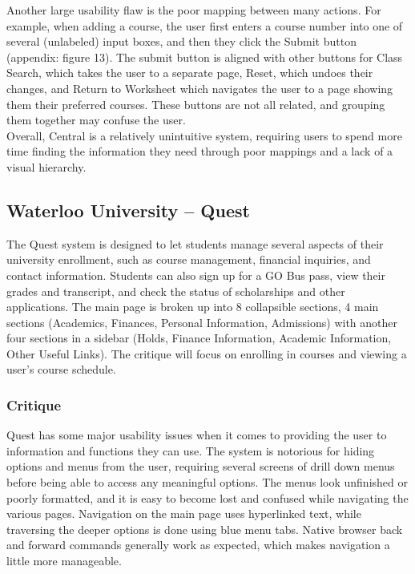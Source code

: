 \documentclass[10pt]{article}
\begin{document}
\begin{multicols}{2}
Another large usability flaw is the poor mapping between many actions. For 
example, when adding a course, the user first enters a course number into one of 
several (unlabeled) input boxes, and then they click the Submit button (appendix: 
figure 13). The submit button is aligned with other buttons for Class Search, 
which takes the user to a separate page, Reset, which undoes their changes, and 
Return to Worksheet which navigates the user to a page showing them their 
preferred courses. These buttons are not all related, and grouping them together 
may confuse the user.\\

Overall, Central is a relatively unintuitive system, requiring users to spend 
more time finding the information they need through poor mappings and a lack of 
a visual hierarchy.

\subsection*{Waterloo University -- Quest}
The Quest system is designed to let students manage several aspects 
of their university enrollment, such as course management, financial inquiries, 
and contact information. Students can also sign up for a GO Bus pass, view their 
grades and transcript, and check the status of scholarships and other 
applications. The main page is broken up into 8 collapsible sections, 4 main 
sections (Academics, Finances, Personal Information, Admissions) with another four 
sections in a sidebar (Holds, Finance Information, Academic Information, Other 
Useful Links). The critique will focus on enrolling in courses and viewing a 
user's course schedule.

\subsubsection*{Critique}
Quest has some major usability issues when it comes to providing the user to 
information and functions they can use. The system is notorious for hiding 
options and menus from the user, requiring several screens of drill down menus 
before being able to access any meaningful options. The menus look unfinished or 
poorly formatted, and it is easy to become lost and confused while navigating 
the various pages. Navigation on the main page uses hyperlinked text, 
while traversing the deeper options is done using blue menu tabs. Native browser 
back and forward commands generally work as expected, which makes navigation a 
little more manageable. 


\end{multicols}
\end{document}
